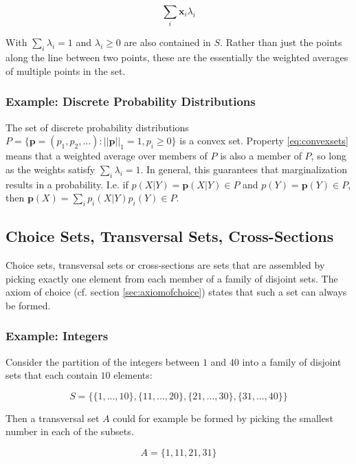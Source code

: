\begin{equation}
\sum_i \mathbf{x}_i \lambda_i 
\label{eq:convexsets}
\end{equation}  

With $\sum_i \lambda_i = 1$ and $\lambda_i\geq 0$ are also contained in $S$. Rather than just the points along the line between two points, these are the essentially the weighted averages of multiple points in the set.  

\subsubsection{Example: Discrete Probability Distributions}
The set of discrete probability distributions $P = \{ \mathbf{p}=(p_1,p_2,...): ||\mathbf{p}||_1 = 1, p_i \geq 0\}$ is a convex set. Property \ref{eq:convexsets} means that a weighted average over members of $P$ is also a member of $P$, so long as the weights satisfy $\sum_i \lambda_i = 1$. In general, this guarantees that marginalization results in a probability. I.e. if $p(X|Y) = \mathbf{p}(X|Y) \in P$ and $p(Y) = \mathbf{p}(Y) \in P$, then $\mathbf{p}(X) = \sum_i p_i(X|Y) p_i(Y) \in P$. 

\subsection{Choice Sets, Transversal Sets, Cross-Sections}
\label{sec:choicesets}
Choice sets, transversal sets or cross-sections are sets that are assembled by picking exactly one element from each member of a family of disjoint sets. The axiom of choice (cf. section \ref{sec:axiomofchoice}) states that such a set can always be formed.

\subsubsection{Example: Integers}
Consider the partition of the integers between $1$ and $40$ into a family of disjoint sets that each contain $10$ elements: 

\begin{equation}
S = \{ \{1,...,10\}, \{11,...,20\}, \{21,...,30\},\{31,...,40\} \}
\end{equation}

Then a transversal set $A$ could for example be formed by picking the smallest number in each of the subsets. 

\begin{equation}
A = \{1,11,21,31\}
\end{equation}

